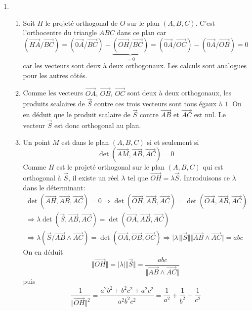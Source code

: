 \begin{enumerate}
 \item
\begin{enumerate}
 \item Soit $H$ le projeté orthogonal de $O$ sur le plan $(A,B,C)$. C'est l'orthocentre du triangle $ABC$ dans ce plan car
\begin{displaymath}
 (\overrightarrow{HA}/\overrightarrow{BC})
= (\overrightarrow{0A}/\overrightarrow{BC}) - \underset{=0}{\underbrace{(\overrightarrow{OH}/\overrightarrow{BC})}}
= (\overrightarrow{0A}/\overrightarrow{OC}) - (\overrightarrow{0A}/\overrightarrow{OB}) = 0
\end{displaymath}
car les vecteurs sont deux à deux orthogonaux. Les calculs sont analogues pour les autres côtés.
 \item Comme les vecteurs $\overrightarrow{OA}$, $\overrightarrow{OB}$, $\overrightarrow{OC}$ sont deux à deux orthogonaux,  les produits scalaires de $\overrightarrow{S}$ contre ces trois vecteurs sont tous égaux à $1$. On en déduit que le produit scalaire de $\overrightarrow S$ contre $\overrightarrow{AB}$ et $\overrightarrow{AC}$ est nul. Le vecteur $\overrightarrow S$ est donc orthogonal au plan. 
 \item Un point $M$ est dans le plan $(A,B,C)$ si et seulement si
\begin{displaymath}
 \det(\overrightarrow{AM},\overrightarrow{AB},\overrightarrow{AC})=0
\end{displaymath}
Comme $H$ est le projeté orthogonal sur le plan $(A,B,C)$ qui est orthogonal à $\overrightarrow S$, il existe un réel $\lambda$ tel que $\overrightarrow{OH}=\lambda \overrightarrow S$. Introduisons ce $\lambda$ dans le déterminant:
\begin{multline*}
 \det(\overrightarrow{AH},\overrightarrow{AB},\overrightarrow{AC})=0
\Rightarrow 
  \det(\overrightarrow{OH},\overrightarrow{AB},\overrightarrow{AC})
= \det(\overrightarrow{OA},\overrightarrow{AB},\overrightarrow{AC})\\
\Rightarrow
  \lambda \det(\overrightarrow{S},\overrightarrow{AB},\overrightarrow{AC})
= \det(\overrightarrow{OA},\overrightarrow{AB},\overrightarrow{AC})\\
\Rightarrow
\lambda (\overrightarrow S / \overrightarrow{AB}\wedge\overrightarrow{AC})
= \det(\overrightarrow{OA} , \overrightarrow{OB},\overrightarrow{OC})
\Rightarrow
|\lambda|\Vert\overrightarrow S\Vert \Vert \overrightarrow{AB}\wedge\overrightarrow{AC} \Vert
= abc
\end{multline*}
On en déduit
\begin{displaymath}
\Vert \overrightarrow{OH}\Vert = |\lambda|\Vert\overrightarrow S\Vert
=
\frac{abc}{\Vert \overrightarrow{AB}\wedge\overrightarrow{AC} \Vert} 
\end{displaymath}
puis
\begin{displaymath}
 \frac{1}{\Vert \overrightarrow{OH} \Vert^2} = \frac{a^2b^2 + b^2c^2 + a^2c^2}{a^2b^2c^2}
=\frac{1}{a^2}+\frac{1}{b^2}+\frac{1}{c^2}
\end{displaymath}

\end{enumerate}

\end{enumerate}
